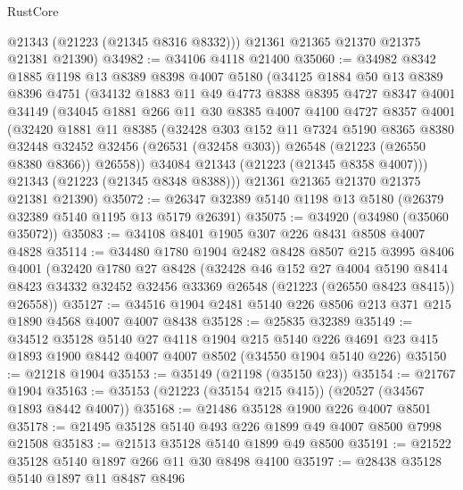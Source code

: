 \begin{lexlean}{RustCore}
\begin{coremodule}
        @21343
        (@21223 (@21345 @8316 @8332)))
      @21361
      @21365
      @21370
      @21375
      @21381
      @21390)
@34982 := @34106 @4118 @21400
@35060 := @34982
    @8342
    @1885
    @1198
    @13
    @8389
    @8398
    @4007
    @5180
    (@34125
      @1884
      @50
      @13
      @8389
      @8396
      @4751
      (@34132
        @1883
        @11
        @49
        @4773
        @8388
        @8395
        @4727
        @8347
        @4001
        @34149
        (@34045
          @1881
          @266
          @11
          @30
          @8385
          @4007
          @4100
          @4727
          @8357
          @4001
          (@32420
            @1881
            @11
            @8385
            (@32428
              @303
              @152
              @11
              @7324
              @5190
              @8365
              @8380
              @32448
              @32452
              @32456
              (@26531 (@32458 @303))
              @26548
              (@21223 (@26550 @8380 @8366))
              @26558))
          @34084
          @21343
          (@21223 (@21345 @8358 @4007)))
        @21343
        (@21223 (@21345 @8348 @8388)))
      @21361
      @21365
      @21370
      @21375
      @21381
      @21390)
@35072 := @26347 @32389 @5140 @1198 @13 @5180 (@26379 @32389 @5140 @1195 @13 @5179 @26391)
@35075 := @34920 (@34980 (@35060 @35072))
@35083 := @34108 @8401 @1905 @307 @226 @8431 @8508 @4007 @4828
@35114 := @34480
    @1780
    @1904
    @2482
    @8428
    @8507
    @215
    @3995
    @8406
    @4001
    (@32420
      @1780
      @27
      @8428
      (@32428
        @46
        @152
        @27
        @4004
        @5190
        @8414
        @8423
        @34332
        @32452
        @32456
        @33369
        @26548
        (@21223 (@26550 @8423 @8415))
        @26558))
@35127 := @34516 @1904 @2481 @5140 @226 @8506 @213 @371 @215 @1890 @4568 @4007 @4007 @8438
@35128 := @25835 @32389
@35149 := @34512
    @35128
    @5140
    @27
    @4118
    @1904
    @215
    @5140
    @226
    @4691
    @23
    @415
    @1893
    @1900
    @8442
    @4007
    @4007
    @8502
    (@34550 @1904 @5140 @226)
@35150 := @21218 @1904
@35153 := @35149 (@21198 (@35150 @23))
@35154 := @21767 @1904
@35163 := @35153 (@21223 (@35154 @215 @415)) (@20527 (@34567 @1893 @8442 @4007))
@35168 := @21486 @35128 @1900 @226 @4007 @8501
@35178 := @21495 @35128 @5140 @493 @226 @1899 @49 @4007 @8500 @7998 @21508
@35183 := @21513 @35128 @5140 @1899 @49 @8500
@35191 := @21522 @35128 @5140 @1897 @266 @11 @30 @8498 @4100
@35197 := @28438 @35128 @5140 @1897 @11 @8487 @8496

\end{coremodule}
\end{lexlean}
